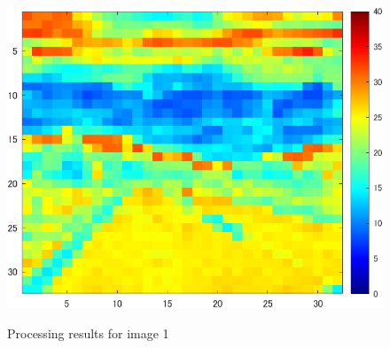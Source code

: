 \documentclass[conference]{IEEEtran}
\begin{document}
\begin{figure}[tb]
\begin{minipage}[t]{0.32\linewidth}
    \label{fig:3-1-3}
  \end{minipage}
  \begin{minipage}[t]{0.32\linewidth}
    \centering
    \includegraphics[width=0.9\columnwidth]{figures/Ex_re2.png}
    \label{fig:3-1-4}
  \end{minipage}
  \caption{Processing results for image 1}
  \label{fig:3-1-1}
\end{figure}
\end{document}
